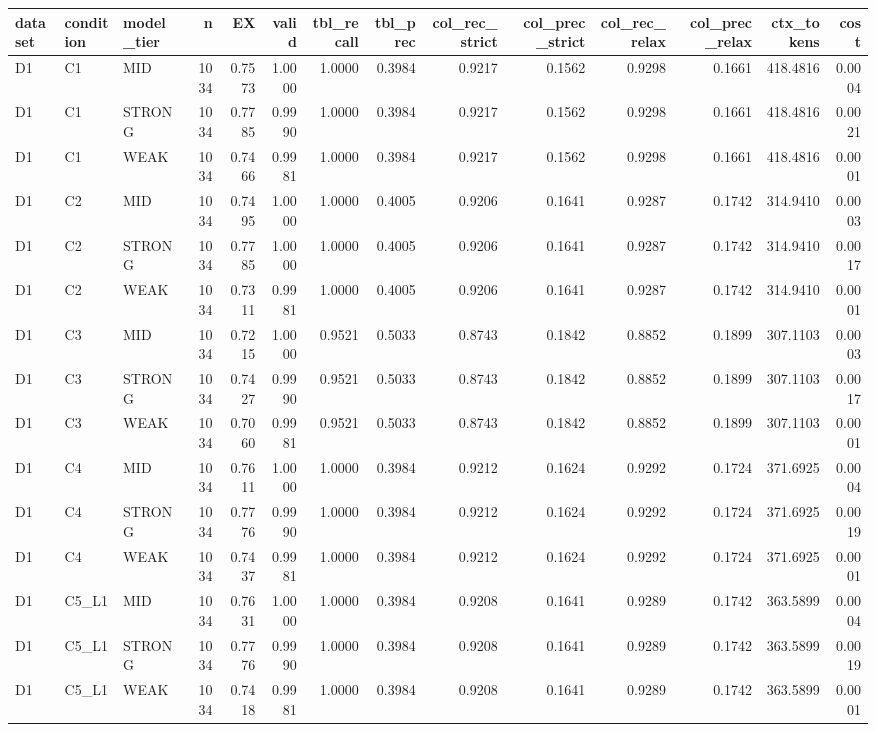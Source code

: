 \begin{tabular}{lllrrrrrrrrrrr}
\toprule
dataset & condition & model\_tier & n & EX & valid & tbl\_recall & tbl\_prec & col\_rec\_strict & col\_prec\_strict & col\_rec\_relax & col\_prec\_relax & ctx\_tokens & cost \\
\midrule
D1 & C1 & MID & 1034 & 0.7573 & 1.0000 & 1.0000 & 0.3984 & 0.9217 & 0.1562 & 0.9298 & 0.1661 & 418.4816 & 0.0004 \\
D1 & C1 & STRONG & 1034 & 0.7785 & 0.9990 & 1.0000 & 0.3984 & 0.9217 & 0.1562 & 0.9298 & 0.1661 & 418.4816 & 0.0021 \\
D1 & C1 & WEAK & 1034 & 0.7466 & 0.9981 & 1.0000 & 0.3984 & 0.9217 & 0.1562 & 0.9298 & 0.1661 & 418.4816 & 0.0001 \\
D1 & C2 & MID & 1034 & 0.7495 & 1.0000 & 1.0000 & 0.4005 & 0.9206 & 0.1641 & 0.9287 & 0.1742 & 314.9410 & 0.0003 \\
D1 & C2 & STRONG & 1034 & 0.7785 & 1.0000 & 1.0000 & 0.4005 & 0.9206 & 0.1641 & 0.9287 & 0.1742 & 314.9410 & 0.0017 \\
D1 & C2 & WEAK & 1034 & 0.7311 & 0.9981 & 1.0000 & 0.4005 & 0.9206 & 0.1641 & 0.9287 & 0.1742 & 314.9410 & 0.0001 \\
D1 & C3 & MID & 1034 & 0.7215 & 1.0000 & 0.9521 & 0.5033 & 0.8743 & 0.1842 & 0.8852 & 0.1899 & 307.1103 & 0.0003 \\
D1 & C3 & STRONG & 1034 & 0.7427 & 0.9990 & 0.9521 & 0.5033 & 0.8743 & 0.1842 & 0.8852 & 0.1899 & 307.1103 & 0.0017 \\
D1 & C3 & WEAK & 1034 & 0.7060 & 0.9981 & 0.9521 & 0.5033 & 0.8743 & 0.1842 & 0.8852 & 0.1899 & 307.1103 & 0.0001 \\
D1 & C4 & MID & 1034 & 0.7611 & 1.0000 & 1.0000 & 0.3984 & 0.9212 & 0.1624 & 0.9292 & 0.1724 & 371.6925 & 0.0004 \\
D1 & C4 & STRONG & 1034 & 0.7776 & 0.9990 & 1.0000 & 0.3984 & 0.9212 & 0.1624 & 0.9292 & 0.1724 & 371.6925 & 0.0019 \\
D1 & C4 & WEAK & 1034 & 0.7437 & 0.9981 & 1.0000 & 0.3984 & 0.9212 & 0.1624 & 0.9292 & 0.1724 & 371.6925 & 0.0001 \\
D1 & C5\_L1 & MID & 1034 & 0.7631 & 1.0000 & 1.0000 & 0.3984 & 0.9208 & 0.1641 & 0.9289 & 0.1742 & 363.5899 & 0.0004 \\
D1 & C5\_L1 & STRONG & 1034 & 0.7776 & 0.9990 & 1.0000 & 0.3984 & 0.9208 & 0.1641 & 0.9289 & 0.1742 & 363.5899 & 0.0019 \\
D1 & C5\_L1 & WEAK & 1034 & 0.7418 & 0.9981 & 1.0000 & 0.3984 & 0.9208 & 0.1641 & 0.9289 & 0.1742 & 363.5899 & 0.0001 \\

\end{tabular}
